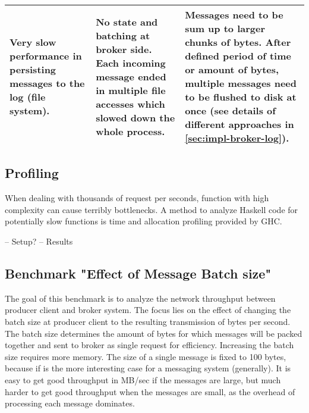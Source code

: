 \begin{table}[H]
\begin{tabular}{|p{4cm}|p{5cm}|p{6cm}|}
Very slow performance in persisting messages to the log (file system).                                 & No state and batching at broker side. Each incoming message ended in multiple file accesses which slowed down the whole process.                                                                                                                                & Messages need to be sum up to larger chunks of bytes. After defined period of time or amount of bytes, multiple messages need to be flushed to disk at once (see details of different approaches in \ref{sec:impl-broker-log}).                                                                                                                                      \\ \hline
\end{tabular}
\end{table}


\subsection{Profiling}
When dealing with thousands of request per seconds, function with high complexity
can cause terribly bottlenecks. A method to analyze Haskell code for
potentially slow functions is time and allocation profiling provided by GHC.

-- Setup?
-- Results 

\subsection{Benchmark "Effect of Message Batch size"}
The goal of this benchmark is to analyze the network throughput between
producer client and broker system.  The focus lies on the effect of changing
the batch size at producer client to the resulting transmission of bytes per
second. The batch size determines the amount of bytes for which messages will
be packed together and sent to broker as single request for efficiency.
Increasing the batch size requires more memory. The size of a single message is
fixed to 100 bytes, because if is the more interesting case for a messaging system
(generally). It is easy to get good throughput in MB/sec if the messages are
large, but much harder to get good throughput when the messages are small, as
the overhead of processing each message dominates. 

